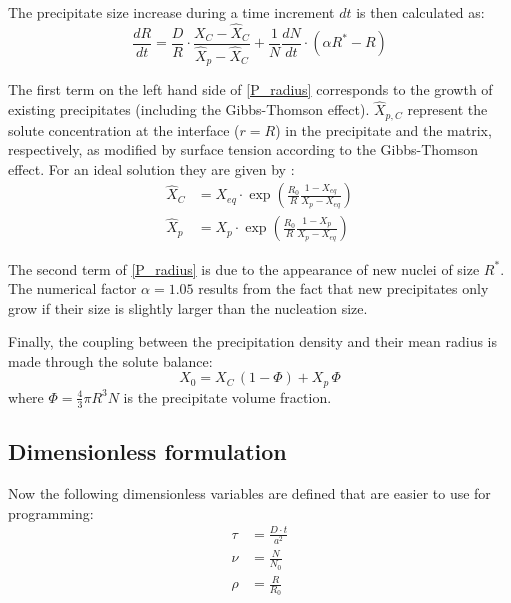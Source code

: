 \documentclass[12pt,a4paper]{article}
\begin{document}
The precipitate size increase during a time increment $dt$ is then calculated as:
\begin{equation}
\label{P_radius}
\frac{dR}{dt} = \frac{D}{R} \cdot \frac{X_C - \hat{X}_C}{\hat{X}_p - \hat{X}_C} + \frac{1}{N}\frac{dN}{dt} \cdot (\alpha R^* - R)
\end{equation}

The first term on the left hand side of \eqref{P_radius} corresponds to the growth of existing precipitates (including the Gibbs-Thomson effect). $\hat{X}_{p,C}$ represent the solute concentration at the interface ($r=R$) in the precipitate and the matrix, respectively, as modified by surface tension according to the Gibbs-Thomson effect. For an ideal solution they are given by \citep{Wagner-2005-HomogeneousSecond-P,Calderon-1994-Ostwaldripeningin}:
\begin{subequations}
	\begin{align}
\hat{X}_C &=  X_{eq} \cdot \exp \left( \frac{R_0}{R} \frac{1-X_{eq}}{X_p - X_{eq}}\right) \\
\hat{X}_p &=   X_{p} \cdot \exp \left( \frac{R_0}{R} \frac{1-X_{p}}{X_p - X_{eq}}\right)
	\end{align}	
\end{subequations}

The second term of \eqref{P_radius} is due to the appearance of new nuclei of
size $R^*$. The numerical factor $\alpha = 1.05$ results from the fact that new precipitates only grow if their size is slightly larger than the nucleation size. 

Finally, the coupling between the precipitation density and their mean radius is made through the solute balance:
\begin{equation}
X_0 = X_C\,(1-\Phi) + X_p\,\Phi
\end{equation}
where $\Phi=\frac{4}{3}\pi R^3 N$ is the precipitate volume fraction.

\subsection{Dimensionless formulation}
Now the following dimensionless variables are defined that are easier to use for programming:
\begin{subequations}
	\begin{align}
\tau &= \frac{D\cdot t}{a^2} \\
\nu &= \frac{N}{N_0} \\
\rho &= \frac{R}{R_0}
	\end{align}
\end{subequations}
\end{document}
